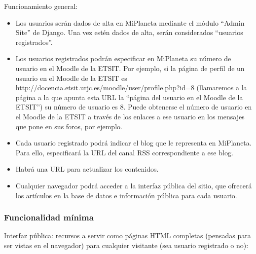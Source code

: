 Funcionamiento general:

\begin{itemize}
\item Los usuarios serán dados de alta en MiPlaneta mediante el módulo ``Admin Site'' de Django. Una vez estén dados de alta, serán considerados ``usuarios registrados''.

\item Los usuarios registrados podrán especificar en MiPlaneta su número de usuario en el Moodle de la ETSIT. Por ejemplo, si la página de perfil de un usuario en el Moodle de la ETSIT es \url{http://docencia.etsit.urjc.es/moodle/user/profile.php?id=8} (llamaremos a la página a la que apunta esta URL la ``página del usuario en el Moodle de la ETSIT'') su número de usuario es 8. Puede obtenerse el número de usuario en el Moodle de la ETSIT a través de los enlaces a ese usuario en los mensajes que pone en sus foros, por ejemplo.

\item Cada usuario registrado podrá indicar el blog que le representa en MiPlaneta. Para ello, especificará la URL del canal RSS correspondiente a ese blog.

\item Habrá una URL para actualizar los contenidos.

\item Cualquier navegador podrá acceder a la interfaz pública del sitio, que ofrecerá los artículos en la base de datos e información pública para cada usuario.
\end{itemize}


\subsubsection{Funcionalidad mínima}

Interfaz pública: recursos a servir como páginas HTML completas (pensadas para ser vistas en el navegador) para cualquier visitante (sea usuario registrado o no):

